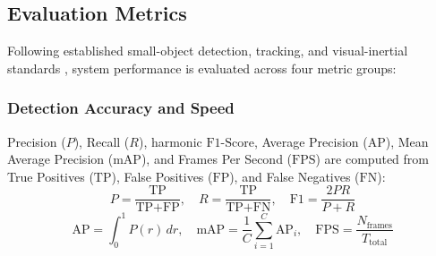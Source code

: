 \documentclass[conference]{IEEEtran}
\begin{document}
\begin{table}[!t]
\centering
\caption{Small-Drone Detection Performance Comparison Across Lightweight YOLO Architectures ($14,400$ Validation Frames, Input $640 \times 640$).}
\label{tab:detection}
\footnotesize
\renewcommand{\arraystretch}{1.15}
\end{table}

\subsection{Evaluation Metrics}
Following established small-object detection, tracking, and visual-inertial standards \cite{ref6, ref16, ref17, ref18, ref19}, system performance is evaluated across four metric groups:

\subsubsection{Detection Accuracy and Speed}
Precision ($P$), Recall ($R$), harmonic $\text{F1-Score}$, Average Precision ($\text{AP}$), Mean Average Precision ($\text{mAP}$), and Frames Per Second ($\text{FPS}$) are computed from True Positives ($\text{TP}$), False Positives ($\text{FP}$), and False Negatives ($\text{FN}$):
\begin{equation}
P = \frac{\text{TP}}{\text{TP} + \text{FP}}, \quad R = \frac{\text{TP}}{\text{TP} + \text{FN}}, \quad \text{F1} = \frac{2 P R}{P + R}
\label{eq:prf1}
\end{equation}
\begin{equation}
\text{AP} = \int_{0}^{1} P(r)\,dr, \quad \text{mAP} = \frac{1}{C}\sum_{i=1}^{C}\text{AP}_i, \quad \text{FPS} = \frac{N_{\text{frames}}}{T_{\text{total}}}
\label{eq:map_fps}
\end{equation}
\end{document}
